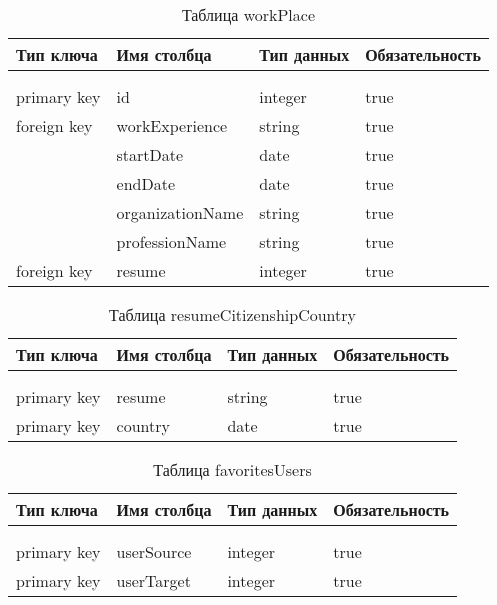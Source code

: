 \begin{xltabular}{\textwidth}{|l|l|p{1.7cm}|X|}
	\caption{Таблица workPlace \label{workPlace:table}}\\ \hline
	\centrow Тип ключа & \centrow Имя столбца & \centrow Тип
	данных & \centrow Обязательность \\ \hline
	 &  &  &  \\ \hline
	\endfirsthead
	 &  &  &  \\ \hline
	\finishhead
	primary key & id & integer & true \\ \hline
	foreign key	& workExperience & string & true \\ \hline
	& startDate & date & true \\ \hline
	& endDate & date & true \\ \hline
	& organizationName & string & true \\ \hline
	& professionName & string & true \\ \hline
	foreign key	& resume & integer & true \\ \hline
\end{xltabular}

\begin{xltabular}{\textwidth}{|l|l|p{1.7cm}|X|}
	\caption{Таблица resumeCitizenshipCountry \label{resumeCitizenshipCountry:table}}\\ \hline
	\centrow Тип ключа & \centrow Имя столбца & \centrow Тип
	данных & \centrow Обязательность \\ \hline
	 &  &  &  \\ \hline
	\endfirsthead
	 &  &  &  \\ \hline
	\finishhead
	primary key	& resume & string & true \\ \hline
	primary key & country & date & true \\ \hline
\end{xltabular}

\begin{xltabular}{\textwidth}{|l|l|p{1.7cm}|X|}
	\caption{Таблица favoritesUsers \label{favoritesUsers:table}}\\ \hline
	\centrow Тип ключа & \centrow Имя столбца & \centrow Тип данных & \centrow Обязательность \\ \hline
	 &  &  &  \\ \hline
	\endfirsthead
	 &  &  &  \\ \hline
	\finishhead
	primary key & userSource & integer & true \\ \hline
	primary key & userTarget & integer & true \\ \hline
\end{xltabular}


